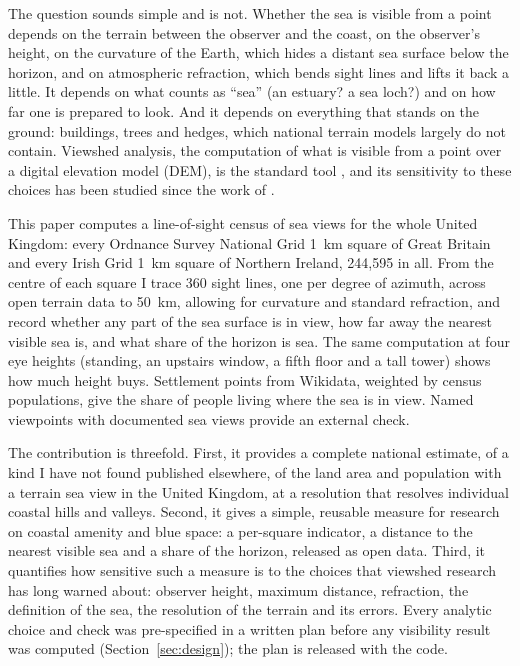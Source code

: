 \documentclass[11pt,a4paper]{article}
\begin{document}
The question sounds simple and is not. Whether the sea is visible from a point depends on the terrain between the observer and the coast, on the observer's height, on the curvature of the Earth, which hides a distant sea surface below the horizon, and on atmospheric refraction, which bends sight lines and lifts it back a little. It depends on what counts as ``sea'' (an estuary? a sea loch?) and on how far one is prepared to look. And it depends on everything that stands on the ground: buildings, trees and hedges, which national terrain models largely do not contain. Viewshed analysis, the computation of what is visible from a point over a digital elevation model (DEM), is the standard tool \citep{defloriani2003}, and its sensitivity to these choices has been studied since the work of \citet{fisher1991,fisher1992,fisher1993}.

This paper computes a line-of-sight census of sea views for the whole United Kingdom: every Ordnance Survey National Grid 1~km square of Great Britain and every Irish Grid 1~km square of Northern Ireland, 244,595 in all. From the centre of each square I trace 360 sight lines, one per degree of azimuth, across open terrain data to 50~km, allowing for curvature and standard refraction, and record whether any part of the sea surface is in view, how far away the nearest visible sea is, and what share of the horizon is sea. The same computation at four eye heights (standing, an upstairs window, a fifth floor and a tall tower) shows how much height buys. Settlement points from Wikidata, weighted by census populations, give the share of people living where the sea is in view. Named viewpoints with documented sea views provide an external check.

The contribution is threefold. First, it provides a complete national estimate, of a kind I have not found published elsewhere, of the land area and population with a terrain sea view in the United Kingdom, at a resolution that resolves individual coastal hills and valleys. Second, it gives a simple, reusable measure for research on coastal amenity and blue space: a per-square indicator, a distance to the nearest visible sea and a share of the horizon, released as open data. Third, it quantifies how sensitive such a measure is to the choices that viewshed research has long warned about: observer height, maximum distance, refraction, the definition of the sea, the resolution of the terrain and its errors. Every analytic choice and check was pre-specified in a written plan before any visibility result was computed (Section~\ref{sec:design}); the plan is released with the code.
\end{document}
